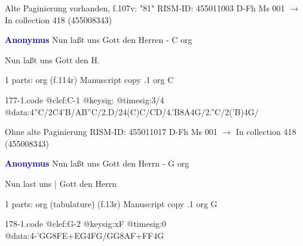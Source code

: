 \documentclass[twocolumn]{book}
\begin{document}
\newline Alte Paginierung vorhanden, f.107v: "81"
\newline RISM-ID: 455011003
\newline D-Fh  Ms 001
\newline $\rightarrow$ In collection 418 (455008343)
      
\newline \par \vspace{7pt} \textcolor{darkblue}{\textbf{Anonymus  }}
\newline Nun laßt uns Gott den Herren - C
\newline org
\newline \begin{itshape}[f.114r, heading:] Nun laßt uns Gott den H.\end{itshape} 
\newline \textcolor{darkblue}{}  1 parts: org  (f.114r)
\newline Manuscript copy
.1  org  C  
\begin{filecontents*}{177-1.code}
@clef:C-1
@keysig:
@timesig:3/4
@data:4''C/2C4'B/AB''C/2.D/24(C)C/CD/4.'B8A4G/2.''C/2('B)4G/
\end{filecontents*}
\newline
%

\newline Ohne alte Paginierung
\newline RISM-ID: 455011017
\newline D-Fh  Ms 001
\newline $\rightarrow$ In collection 418 (455008343)
      
\newline \par \vspace{7pt} \textcolor{darkblue}{\textbf{Anonymus  }}
\newline Nun laßt uns Gott den Herrn - G
\newline org
\newline \begin{itshape}[f.13r, at left:] Nun last uns | Gott den Herrn\end{itshape} 
\newline \textcolor{darkblue}{}  1 parts: org (tabulature)  (f.13r)
\newline Manuscript copy
.1  org  G  
\begin{filecontents*}{178-1.code}
@clef:G-2
@keysig:xF
@timesig:0
@data:4-'GG{8FE+}{EG}4FG/GG{8AF+}{FF}4G
\end{filecontents*}
\newline
%
\end{document}

